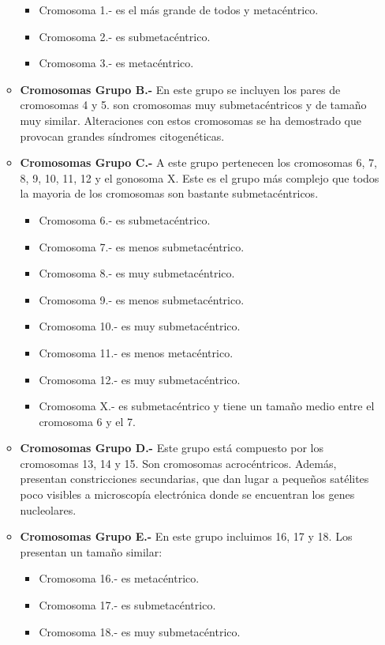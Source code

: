 \documentclass[12pt,letterpaper,titlepage]{article}
\begin{document}
\begin{itemize}
\begin{itemize}
\begin{itemize}\itemsep=0pt
\item  {Cromosoma 1.-} es el más grande de todos y metacéntrico. 
\item  {Cromosoma 2.-} es submetacéntrico. 
\item  {Cromosoma 3.-} es metacéntrico. 
\end{itemize}

\item  \textbf{Cromosomas Grupo B.-} En este grupo se incluyen los pares de cromosomas 4 y 5. son cromosomas muy submetacéntricos y de tamaño muy similar. Alteraciones con estos cromosomas se ha demostrado que provocan grandes síndromes citogenéticas.
\item  \textbf{Cromosomas Grupo C.-} A este grupo pertenecen los cromosomas 6, 7, 8, 9, 10, 11, 12 y el gonosoma X. Este es el grupo más complejo que todos la mayoria de los cromosomas son bastante submetacéntricos.
\begin{itemize}\itemsep=0pt
\item  {Cromosoma 6.-} es submetacéntrico. 
\item  {Cromosoma 7.-} es menos submetacéntrico. 
\item  {Cromosoma 8.-} es muy submetacéntrico. 
\item  {Cromosoma 9.-} es menos submetacéntrico. 
\item  {Cromosoma 10.-} es muy submetacéntrico. 
\item  {Cromosoma 11.-} es menos metacéntrico. 
\item  {Cromosoma 12.-} es muy submetacéntrico. 
\item  {Cromosoma X.-} es submetacéntrico y tiene un tamaño medio entre el cromosoma 6 y el 7. 
\end{itemize}

\item  \textbf{Cromosomas Grupo D.-} Este grupo está compuesto por los cromosomas 13, 14 y 15. Son cromosomas acrocéntricos. Además, presentan constricciones secundarias, que dan lugar a pequeños satélites poco visibles a microscopía electrónica donde se encuentran los genes nucleolares.
\item  \textbf{Cromosomas Grupo E.-} En este grupo incluimos 16, 17 y 18. Los presentan un tamaño similar:
\begin{itemize}\itemsep=0pt
\item  {Cromosoma 16.-} es metacéntrico. 
\item  {Cromosoma 17.-} es submetacéntrico. 
\item  {Cromosoma 18.-} es muy submetacéntrico. 
\end{itemize}


\end{itemize}
\end{itemize}
\end{document}
